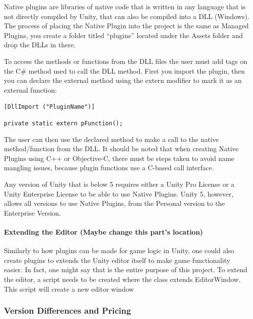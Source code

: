 \documentclass[12pt]{article}
\begin{document}
Native plugins are libraries of native code that is written in any
language that is not directly compiled by Unity, that can also be
compiled into a DLL (Windows). The process of placing the Native Plugin
into the project is the same as Managed Plugins, you create a folder
titled ``plugins'' located under the Assets folder and drop the DLLs in
there.

To access the methods or functions from the DLL files the user must add
tags on the C\# method used to call the DLL method. First you import the
plugin, then you can declare the external method using the extern
modifier to mark it as an external function:

\texttt{{[}DllImport\ ("PluginName"){]}}

\texttt{private\ static\ extern\ pFunction();}

The user can then use the declared method to make a call to the native
method/function from the DLL. It should be noted that when creating
Native Plugins using C++ or Objective-C, there must be steps taken to
avoid name mangling issues, because plugin functions use a C-based call
interface.

Any version of Unity that is below 5 requires either a Unity Pro License
or a Unity Enterprise License to be able to use Native Plugins. Unity 5,
however, allows all versions to use Native Plugins, from the Personal
version to the Enterprise Version. \autocite{unityNative}

\paragraph{Extending the Editor (Maybe change this part's
location)}\label{extending-the-editor-maybe-change-this-parts-location}

Similarly to how plugins can be made for game logic in Unity, one could
also create plugins to extends the Unity editor itself to make game
functionality easier. In fact, one might say that is the entire purpose
of this project. To extend the editor, a script needs to be created
where the class extends EditorWindow. This script will create a new
editor window

\subsubsection{Version Differences and
Pricing}\label{version-differences-and-pricing}
\end{document}
